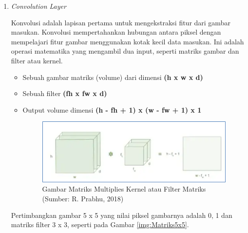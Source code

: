 \begin{enumerate}
	\item \textit{Convolution Layer}
	
	Konvolusi adalah lapisan pertama untuk mengekstraksi fitur dari gambar masukan. Konvolusi mempertahankan hubungan antara piksel dengan mempelajari fitur gambar menggunakan kotak kecil data masukan. Ini adalah operasi matematika yang mengambil dua input, seperti matriks gambar dan filter atau kernel.
	
	\begin{itemize}
		\item Sebuah gambar matriks (volume) dari dimensi \textbf{(h x w x d)}
		\item Sebuah filter \textbf{(fh x fw x d)}
		\item Output volume dimensi \textbf{(h - fh + 1) x (w - fw + 1) x 1 }
		
		\begin{figure}[H]
			\vspace{-0.1cm}
			\begin{center}
				\includegraphics[width=1\columnwidth]{bab2/Gambar/Picture18.png}
			\end{center}
			\vspace{-0.2cm}
			\captionsetup{justification=centering}
			\caption{Gambar Matriks Multiplies Kernel atau Filter Matriks\\(Sumber: R. Prabhu, 2018)}\label{img:Matriks-Multiplies}
		\end{figure}
	\end{itemize}
	Pertimbangkan gambar 5 x 5 yang nilai piksel gambarnya adalah 0, 1 dan matriks filter 3 x 3, seperti pada Gambar \ref{img:Matriks5x5}.
	

\end{enumerate}
